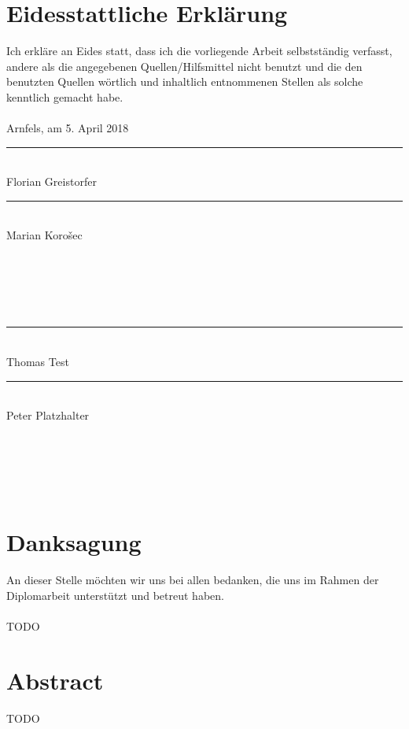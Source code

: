 \frontmatter												%
\addtocounter{page}{2}

\newcommand{\doublesignature}[2]{%
  \parbox{\textwidth}{
    \hfill
    \parbox{7cm}{
      \centering
      \rule{6cm}{1pt}\\
      #1
    }
    \parbox{7cm}{
      \centering
      \rule{6cm}{1pt}\\
      #2
    }
  }
  \mbox{}\\
  \mbox{}\\
  \mbox{}\\
  \mbox{}\\
}

\vspace*{20pt}

\section*{Eidesstattliche Erklärung}
\label{sec:eidesstattliche-erklaerung}
Ich erkläre an Eides statt, dass ich die vorliegende Arbeit selbstständig verfasst, andere als die angegebenen
Quellen/Hilfsmittel nicht benutzt und die den benutzten Quellen wörtlich und inhaltlich entnommenen
Stellen als solche kenntlich gemacht habe.\\
\\
Arnfels, am 5. April 2018\\

\vskip 1cm

\doublesignature{Florian Greistorfer}{Marian Korošec}
\doublesignature{Thomas Test}{Peter Platzhalter}

\vskip 5cm

\clearpage

\newpage
\thispagestyle{empty}
\mbox{}

\clearpage

\section*{Danksagung}
\label{sec:danksagung}
An dieser Stelle möchten wir uns bei allen bedanken, die uns im Rahmen der Diplomarbeit unterstützt und betreut haben.\\
\\
TODO

\clearpage

\newpage
\thispagestyle{empty}
\mbox{}

\clearpage

\section*{Abstract}
\label{sec:abstract}
TODO

